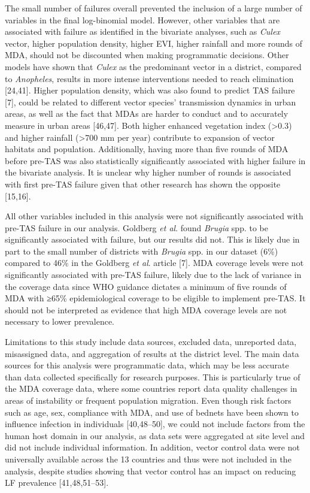 \documentclass[11pt,a4paper]{article}
\begin{document}
The small number of failures overall prevented the inclusion of a large number of variables in the final log-binomial model. However, other variables that are associated with failure as identified in the bivariate analyses, such as \textit{Culex} vector, higher population density, higher EVI, higher rainfall and more rounds of MDA, should not be discounted when making programmatic decisions. Other models have shown that \textit{Culex} as the predominant vector in a district, compared to \textit{Anopheles}, results in more intense interventions needed to reach elimination [24,41]. Higher population density, which was also found to predict TAS failure [7], could be related to different vector species’ transmission dynamics in urban areas, as well as the fact that MDAs are harder to conduct and to accurately measure in urban areas [46,47]. Both higher enhanced vegetation index (>0.3) and higher rainfall (>700 mm per year) contribute to expansion of vector habitats and population. Additionally, having more than five rounds of MDA before pre-TAS was also statistically significantly associated with higher failure in the bivariate analysis. It is unclear why higher number of rounds is associated with first pre-TAS failure given that other research has shown the opposite [15,16].

All other variables included in this analysis were not significantly associated with pre-TAS failure in our analysis. Goldberg \textit{et al}. found \textit{Brugia} spp. to be significantly associated with failure, but our results did not. This is likely due in part to the small number of districts with \textit{Brugia} spp. in our dataset (6\%) compared to 46\% in the Goldberg \textit{et al}. article [7]. MDA coverage levels were not significantly associated with pre-TAS failure, likely due to the lack of variance in the coverage data since WHO guidance dictates a minimum of five rounds of MDA with ≥65\% epidemiological coverage to be eligible to implement pre-TAS. It should not be interpreted as evidence that high MDA coverage levels are not necessary to lower prevalence.

Limitations to this study include data sources, excluded data, unreported data, misassigned data, and aggregation of results at the district level. The main data sources for this analysis were programmatic data, which may be less accurate than data collected specifically for research purposes. This is particularly true of the MDA coverage data, where some countries report data quality challenges in areas of instability or frequent population migration. Even though risk factors such as age, sex, compliance with MDA, and use of bednets have been shown to influence infection in individuals [40,48–50], we could not include factors from the human host domain in our analysis, as data sets were aggregated at site level and did not include individual information. In addition, vector control data were not universally available across the 13 countries and thus were not included in the analysis, despite studies showing that vector control has an impact on reducing LF prevalence [41,48,51–53].
\end{document}
